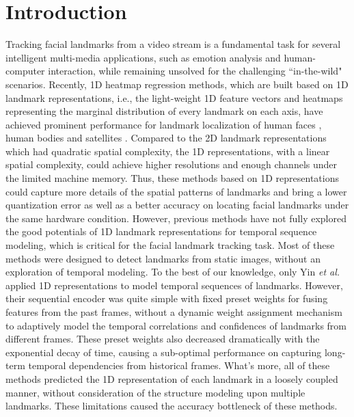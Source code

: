 \documentclass[review]{elsarticle}
\begin{document}

\section{Introduction}

Tracking facial landmarks from a video stream \cite{survey,survey2} is a fundamental task for several intelligent multi-media applications, such as emotion analysis and human-computer interaction, while remaining unsolved for the challenging ``in-the-wild" scenarios. Recently, 1D heatmap regression methods, which are built based on 1D landmark representations, i.e., the light-weight 1D feature vectors and heatmaps representing the marginal distribution of every landmark on each axis, have achieved prominent performance for landmark localization of human faces \cite{AOHR, DBLP:conf/accv/XiongZDS20, HybridMatch}, human bodies \cite{I2L, SimCC, chi2022human} and satellites \cite{DBLP:journals/remotesensing/LiuZCW22}.  Compared to the 2D landmark representations  \cite{hourglass,how_far,HRnet} which had quadratic spatial complexity, the 1D representations, with a linear spatial complexity, could achieve higher resolutions and enough channels under the limited machine memory. Thus, these methods based on 1D representations could capture more details of the spatial patterns of landmarks and bring a lower quantization error as well as a better accuracy on locating facial landmarks under the same hardware condition. However, previous methods have not fully explored the good potentials of 1D landmark representations for temporal sequence modeling, which is critical for the facial landmark tracking task. Most of these methods \cite{DBLP:conf/accv/XiongZDS20, I2L, SimCC, chi2022human, DBLP:journals/remotesensing/LiuZCW22} were designed to detect landmarks from static images, without an exploration of temporal modeling. To the best of our knowledge, only Yin \textit{et al.} \cite{AOHR} applied 1D representations to model temporal sequences of landmarks. However, their sequential encoder was quite simple with fixed preset weights for fusing features from the past frames, without a dynamic weight assignment mechanism to adaptively model the temporal correlations and confidences of landmarks from different frames.  These preset weights also decreased dramatically with the exponential decay of time, causing a sub-optimal performance on capturing long-term temporal dependencies from historical frames. What's more, all of these methods predicted the 1D representation of each landmark in a loosely coupled manner, without consideration of the structure modeling upon multiple landmarks. These limitations caused the accuracy bottleneck of these methods.
\end{document}
